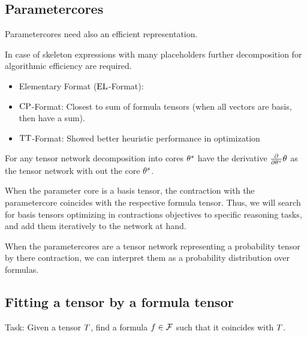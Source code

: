 \subsection{Parametercores}



Parametercores need also an efficient representation.

In case of skeleton expressions with many placeholders further decomposition for algorithmic efficiency are required.
\begin{itemize}
	\item Elementary Format ($\mathrm{EL}$-Format): 
	\item $\mathrm{CP}$-Format: Closest to sum of formula tensors (when all vectors are basis, then have a sum).
	\item $\mathrm{TT}$-Format: Showed better heuristic performance in optimization
\end{itemize}

For any tensor network decomposition into cores $\theta^{s}$ have the derivative $\frac{\partial}{\partial \theta^{s}} \theta$ as the tensor network with out the core $\theta^{s}$.

\begin{remark}
	When the parameter core is a basis tensor, the contraction with the parametercore coincides with the respective formula tensor.
	Thus, we will search for basis tensors optimizing in contractions objectives to specific reasoning tasks, and add them iteratively to the network at hand.
\end{remark}

When the parametercores are a tensor network representing a probability tensor by there contraction, we can interpret them as a probability distribution over formulas.



\subsection{Fitting a tensor by a formula tensor}

Task: Given a tensor $T$, find a formula $f\in\mathcal{F}$ such that it coincides with $T$.

